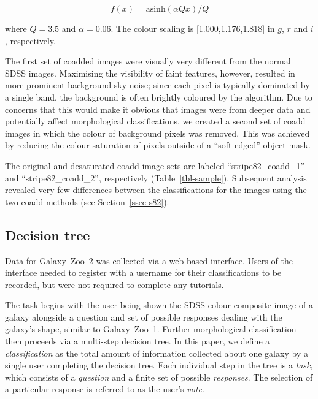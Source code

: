 \documentclass[useAMS,usenatbib]{mn2e}
\begin{document}
\begin{equation}
f(x)=\text{asinh}(\alpha Q x)/Q
\label{eqn-imagegen}
\end{equation}

\noindent where $Q=3.5$ and $\alpha=0.06$. The colour scaling is [1.000,1.176,1.818] in $g$, $r$ and $i$, respectively. 

The first set of coadded images were visually very different from the normal SDSS images. Maximising the visibility of faint features, however, resulted in more prominent background sky noise; since each pixel is typically dominated by a single band, the background is often brightly coloured by the \citet{lup04} algorithm. Due to concerns that this would make it obvious that images were from deeper data and potentially affect morphological classifications, we created a second set of coadd images in which the colour of background pixels was removed. This was achieved by reducing the colour saturation of pixels outside of a ``soft-edged'' object mask. 

The original and desaturated coadd image sets are labeled ``stripe82\_coadd\_1'' and ``stripe82\_coadd\_2'', respectively (Table~\ref{tbl-sample}). Subsequent analysis revealed very few differences between the classifications for the images using the two coadd methods (see Section~\ref{ssec-s82}). 

\subsection{Decision tree}\label{ssec-decision_tree}

Data for Galaxy~Zoo~2 was collected via a web-based interface. Users of the interface needed to register with a username for their classifications to be recorded, but were not required to complete any tutorials.  

The task begins with the user being shown the SDSS colour composite image of a galaxy alongside a question and set of possible responses dealing with the galaxy's shape, similar to Galaxy~Zoo~1. Further morphological classification then proceeds via a multi-step decision tree. In this paper, we define a {\it classification} as the total amount of information collected about one galaxy by a single user completing the decision tree. Each individual step in the tree is a {\it task}, which consists of a {\it question} and a finite set of possible {\it responses}. The selection of a particular response is referred to as the user's {\it vote}.  
\end{document}
